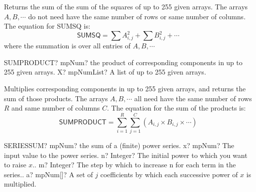 \vspace{0.3cm}
Returns the sum of the sum of the squares of  up to 255 given arrays. The arrays $A, B, \cdots$ do not need have the same number of rows or same number of columns.
The equation for \textsf{SUMSQ} is:
\begin{equation}
	\textsf{SUMSQ} = \sum A_{i,j}^2 + \sum B_{i,j}^2 + \cdots
\end{equation}
where the summation is over all entries of $A, B, \cdots$ 









\begin{mpFunctionsExtract}
	\mpWorksheetFunctionOneNotImplemented
	{SUMPRODUCT? mpNum? the product of corresponding components in up to 255 given arrays.}
	{X? mpNumList? A list of up to 255 given arrays.}
\end{mpFunctionsExtract}

\vspace{0.3cm}
Multiplies corresponding components in up to 255 given arrays, and returns the sum of those products. The arrays $A, B, \cdots$ all need have the same number of rows $R$ and same number of columns $C$.
The equation for the sum of the products is:
\begin{equation}
	\textsf{SUMPRODUCT} = \sum_{i=1}^R \sum_{j=1}^C \left( A_{i,j} \times B_{i,j} \times \cdots \right)
\end{equation}







\begin{mpFunctionsExtract}
	\mpWorksheetFunctionFour
	{SERIESSUM? mpNum? the sum of a (finite) power series.}
	{x? mpNum? The input value to the power series.}
	{n? Integer? The initial power to which you want to raise $x$..}
	{m? Integer? The step by which to increase n for each term in the series..}
	{a? mpNum[]? A set of $j$ coefficients by which each successive power of $x$ is multiplied.}
\end{mpFunctionsExtract}

